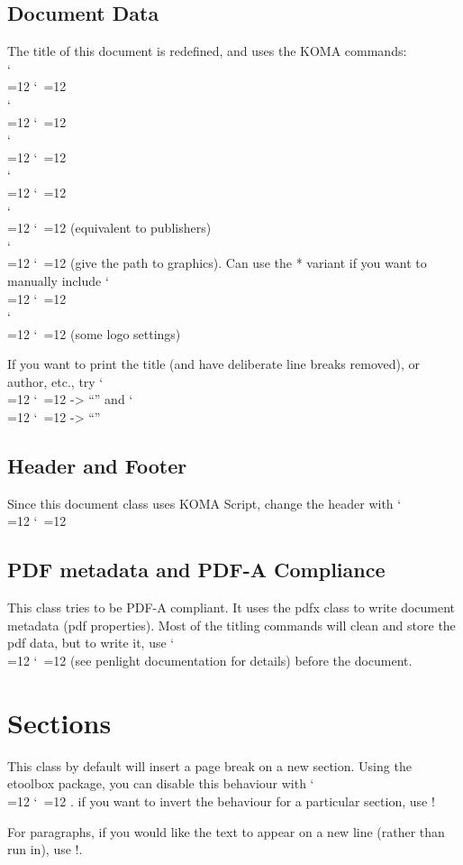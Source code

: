 \documentclass{\FormatDir corpboreportMulti}
\def\cmd{\bgroup\catcode`\\=12 \catcode`\ =12 \cmdA}
\def\cmdA#1{\egroup{\texttt{\detokenize{#1}}}}
\begin{document}
\subsection{Document Data}
The title of this document is redefined, and uses the KOMA commands:\\
\cmd{\title{}}\\
\cmd{\subtitle{}}\\
\cmd{\author{}}\\
\cmd{\date{}}\\
\cmd{\company{}} (equivalent to publishers)\\
\cmd{\logo{}} (give the path to graphics). Can use the * variant if you want to manually include \cmd{\includegraphics}\\
\cmd{\logoset} (some logo settings)

If you want to print the title (and have deliberate line breaks removed), or author, etc.,
try \cmd{\thetitle} -> ``\thetitle'' and \cmd{\theauthor} -> ``\theauthor''


\subsection{Header and Footer}
Since this document class uses KOMA Script, change the header with
\cmd{\lohead{}, \rohead{}}




\subsection{PDF metadata and PDF-A Compliance}

This class tries to be PDF-A compliant.
It uses the pdfx class to write document metadata (pdf properties).
Most of the titling commands will clean and store the pdf data, but to write it,
use \cmd{\writePDFmetadata} (see penlight documentation for details) before the document.


\section{Sections}\label{s.sett}

This class by default will insert a page break on a new section.
Using the etoolbox package, you can disable this behaviour with \cmd{\togglefalse{SecOnNewPage}}.
if you want to invert the behaviour for a particular section, use !

For paragraphs, if you would like the text to appear on a new line (rather than run in), use !.
\end{document}

